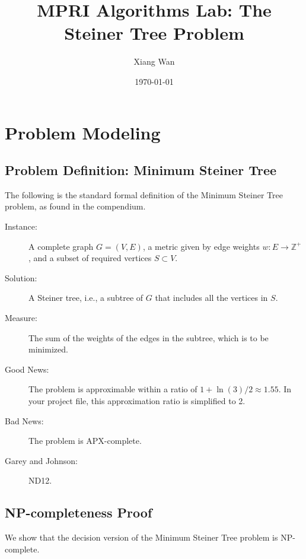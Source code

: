 \documentclass{article}
\title{MPRI Algorithms Lab: The Steiner Tree Problem}
\author{Xiang Wan}
\date{\today}
\begin{document}
\maketitle

\section{Problem Modeling}

\subsection{Problem Definition: Minimum Steiner Tree}
\label{sec:problem_definition_en}

The following is the standard formal definition of the Minimum Steiner Tree problem, as found in the compendium.

\begin{description}
    \item[Instance:] 
    A complete graph $G=(V,E)$, a metric given by edge weights $w: E \to \mathbb{Z}^+$, and a subset of required vertices $S \subset V$.

    \item[Solution:] 
    A Steiner tree, i.e., a subtree of $G$ that includes all the vertices in $S$.

    \item[Measure:] 
    The sum of the weights of the edges in the subtree, which is to be minimized.

    \item[Good News:] 
    The problem is approximable within a ratio of $1+\ln(3)/2 \approx 1.55$. In your project file, this approximation ratio is simplified to 2.

    \item[Bad News:] 
    The problem is APX-complete.
    
    \item[Garey and Johnson:] ND12.
\end{description}


\subsection{NP-completeness Proof}
\label{sec:np_completeness_proof}

We show that the decision version of the Minimum Steiner Tree problem is NP-complete.
\end{document}
